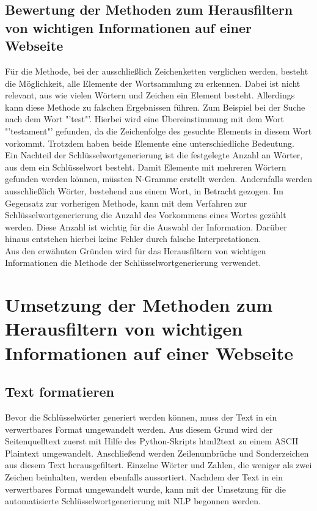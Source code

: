 	\subsection{Bewertung der Methoden zum Herausfiltern von wichtigen Informationen auf einer Webseite}
	Für die Methode, bei der ausschließlich Zeichenketten verglichen werden, besteht die Möglichkeit, alle Elemente der Wortsammlung zu erkennen. Dabei ist nicht relevant, aus wie vielen Wörtern und Zeichen ein Element besteht. Allerdings kann diese Methode zu falschen Ergebnissen führen. Zum Beispiel bei der Suche nach dem Wort "'test"'. Hierbei wird eine Übereinstimmung mit dem Wort "'testament"' gefunden, da die Zeichenfolge des gesuchte Elements in diesem Wort vorkommt. Trotzdem haben beide Elemente eine unterschiedliche Bedeutung. \\
	Ein Nachteil der Schlüsselwortgenerierung ist die festgelegte Anzahl an Wörter, aus dem ein Schlüsselwort besteht. Damit Elemente mit mehreren Wörtern gefunden werden können, müssten N-Gramme erstellt werden. Andernfalls werden ausschließlich Wörter, bestehend aus einem Wort, in Betracht gezogen. Im Gegensatz zur vorherigen Methode, kann mit dem Verfahren zur Schlüsselwortgenerierung die Anzahl des Vorkommens eines Wortes gezählt werden. Diese Anzahl ist wichtig für die Auswahl der Information. Darüber hinaus entstehen hierbei keine Fehler durch falsche Interpretationen.\\
	Aus den erwähnten Gründen wird für das Herausfiltern von wichtigen Informationen die Methode der Schlüsselwortgenerierung verwendet.


\section{Umsetzung der Methoden zum Herausfiltern von wichtigen Informationen auf einer Webseite}
	\subsection{Text formatieren}
	\label{subsec:TextFormatieren}
	Bevor die Schlüsselwörter generiert werden können, muss der Text in ein verwertbares Format umgewandelt werden. Aus diesem Grund wird der Seitenquelltext zuerst mit Hilfe des Python-Skripts html2text zu einem ASCII Plaintext umgewandelt.\cite{html2text} Anschließend werden Zeilenumbrüche und Sonderzeichen aus diesem Text herausgefiltert. Einzelne Wörter und Zahlen, die weniger als zwei Zeichen beinhalten, werden ebenfalls aussortiert. Nachdem der Text in ein verwertbares Format umgewandelt wurde, kann mit der Umsetzung für die automatisierte Schlüsselwortgenerierung mit NLP begonnen werden.
	

